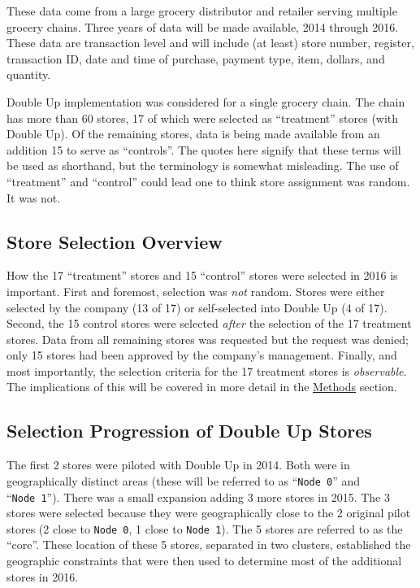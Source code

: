 \documentclass[11pt,letterpaperpaper,]{book}
\begin{document}
These data come from a large grocery distributor and retailer serving
multiple grocery chains. Three years of data will be made available,
2014 through 2016. These data are transaction level and will include (at
least) store number, register, transaction ID, date and time of
purchase, payment type, item, dollars, and quantity.

Double Up implementation was considered for a single grocery chain. The
chain has more than 60 stores, 17 of which were selected as
``treatment'' stores (with Double Up). Of the remaining stores, data is
being made available from an addition 15 to serve as ``controls''. The
quotes here signify that these terms will be used as shorthand, but the
terminology is somewhat misleading. The use of ``treatment'' and
``control'' could lead one to think store assignment was random. It was
not.

\subsection*{Store Selection Overview}\label{store-selection-overview}

How the 17 ``treatment'' stores and 15 ``control'' stores were selected
in 2016 is important. First and foremost, selection was \emph{not}
random. Stores were either selected by the company (13 of 17) or
self-selected into Double Up (4 of 17). Second, the 15 control stores
were selected \emph{after} the selection of the 17 treatment stores.
Data from all remaining stores was requested but the request was denied;
only 15 stores had been approved by the company's management. Finally,
and most importantly, the selection criteria for the 17 treatment stores
is \emph{observable}. The implications of this will be covered in more
detail in the \protect\hyperlink{methods}{Methods} section.

\subsection*{Selection Progression of Double Up
Stores}\label{selection-progression-of-double-up-stores}

The first 2 stores were piloted with Double Up in 2014. Both were in
geographically distinct areas (these will be referred to as
``\texttt{Node\ 0}'' and ``\texttt{Node\ 1}''). There was a small
expansion adding 3 more stores in 2015. The 3 stores were selected
because they were geographically close to the 2 original pilot stores (2
close to \texttt{Node\ 0}, 1 close to \texttt{Node\ 1}). The 5 stores
are referred to as the ``core''. These location of these 5 stores,
separated in two clusters, established the geographic constraints that
were then used to determine most of the additional stores in 2016.
\end{document}
